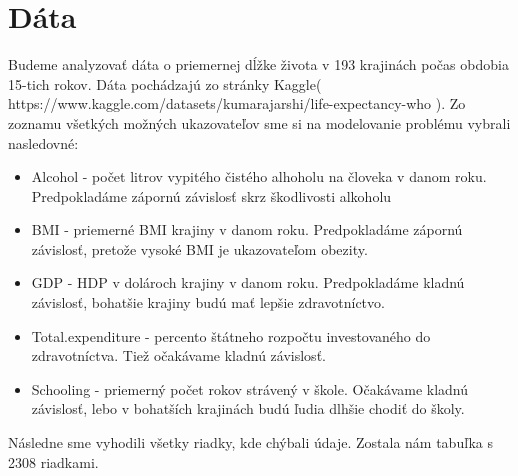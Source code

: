 \section*{Dáta}

Budeme analyzovať dáta o priemernej dĺžke života v 193 krajinách počas obdobia 15-tich rokov.
Dáta pochádzajú zo stránky Kaggle( https://www.kaggle.com/datasets/kumarajarshi/life-expectancy-who ).
Zo zoznamu všetkých možných ukazovateľov sme si na modelovanie problému vybrali nasledovné:
\begin{itemize}
    \item Alcohol - počet litrov vypitého čistého alhoholu na človeka v danom roku. Predpokladáme zápornú závislosť skrz škodlivosti alkoholu
    \item BMI - priemerné BMI krajiny v danom roku. Predpokladáme zápornú závislosť, pretože vysoké BMI je ukazovateľom obezity.
    \item GDP - HDP v dolároch krajiny v danom roku. Predpokladáme kladnú závislosť, bohatšie krajiny budú mať lepšie zdravotníctvo.
    \item Total.expenditure - percento štátneho rozpočtu investovaného do zdravotníctva. Tiež očakávame kladnú závislosť.
    \item Schooling - priemerný počet rokov strávený v škole. Očakávame kladnú závislosť, lebo v bohatších krajinách budú ľudia dlhšie chodiť do školy.
  \end{itemize}
Následne sme vyhodili všetky riadky, kde chýbali údaje. Zostala nám tabuľka s 2308 riadkami.

